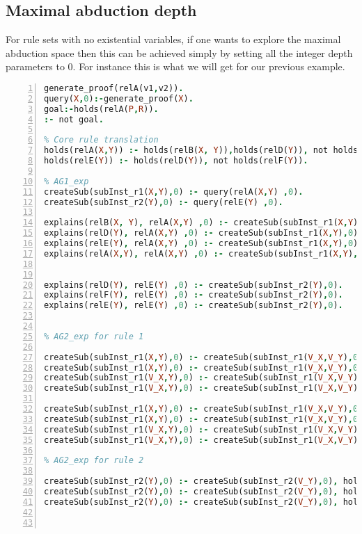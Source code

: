 \documentclass{article}
\begin{document}
\subsection{Maximal abduction depth}
For rule sets with no existential variables, if one wants to explore the maximal abduction space then this can be achieved simply by setting all the integer depth parameters to 0. For instance this is what we will get for our previous example.
\begin{lstlisting}[language=Prolog, numbers=left]
% Encoding the goal
generate_proof(relA(v1,v2)).
query(X,0):-generate_proof(X).
goal:-holds(relA(P,R)).
:- not goal.

% Core rule translation
holds(relA(X,Y)) :- holds(relB(X, Y)),holds(relD(Y)), not holds(relE(Y)).
holds(relE(Y)) :- holds(relD(Y)), not holds(relF(Y)).

% AG1_exp
createSub(subInst_r1(X,Y),0) :- query(relA(X,Y) ,0).
createSub(subInst_r2(Y),0) :- query(relE(Y) ,0).

explains(relB(X, Y), relA(X,Y) ,0) :- createSub(subInst_r1(X,Y),0).
explains(relD(Y), relA(X,Y) ,0) :- createSub(subInst_r1(X,Y),0).
explains(relE(Y), relA(X,Y) ,0) :- createSub(subInst_r1(X,Y),0).
explains(relA(X,Y), relA(X,Y) ,0) :- createSub(subInst_r1(X,Y),0).


explains(relD(Y), relE(Y) ,0) :- createSub(subInst_r2(Y),0).
explains(relF(Y), relE(Y) ,0) :- createSub(subInst_r2(Y),0).
explains(relE(Y), relE(Y) ,0) :- createSub(subInst_r2(Y),0).


% AG2_exp for rule 1

createSub(subInst_r1(X,Y),0) :- createSub(subInst_r1(V_X,V_Y),0), holds(relA(X,Y)).
createSub(subInst_r1(X,Y),0) :- createSub(subInst_r1(V_X,V_Y),0), holds(relB(X,Y)).
createSub(subInst_r1(V_X,Y),0) :- createSub(subInst_r1(V_X,V_Y),0), holds(relD(Y)).
createSub(subInst_r1(V_X,Y),0) :- createSub(subInst_r1(V_X,V_Y),0), holds(relE(Y)).

createSub(subInst_r1(X,Y),0) :- createSub(subInst_r1(V_X,V_Y),0), query(relA(X,Y),0).
createSub(subInst_r1(X,Y),0) :- createSub(subInst_r1(V_X,V_Y),0), query(relB(X,Y),0).
createSub(subInst_r1(V_X,Y),0) :- createSub(subInst_r1(V_X,V_Y),0), query(relD(Y),0).
createSub(subInst_r1(V_X,Y),0) :- createSub(subInst_r1(V_X,V_Y),0), query(relF(Y),0).

% AG2_exp for rule 2

createSub(subInst_r2(Y),0) :- createSub(subInst_r2(V_Y),0), holds(relE(Y)).
createSub(subInst_r2(Y),0) :- createSub(subInst_r2(V_Y),0), holds(relD(Y)).
createSub(subInst_r2(Y),0) :- createSub(subInst_r2(V_Y),0), holds(relF(Y)).



\end{lstlisting}
\end{document}
